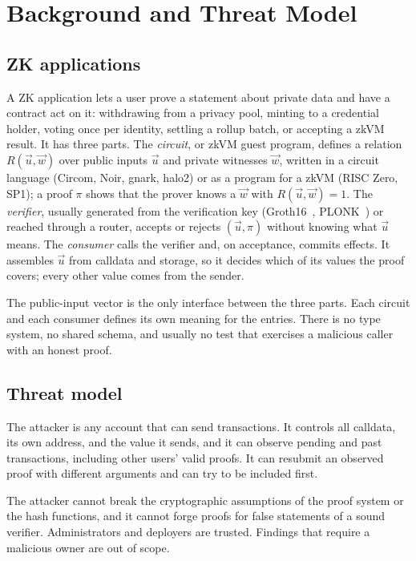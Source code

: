 \section{Background and Threat Model}\label{sec:background}

\subsection{ZK applications}\label{sec:bg-apps}

A ZK application lets a user prove a statement about private data and have a
contract act on it: withdrawing from a privacy pool, minting to a credential
holder, voting once per identity, settling a rollup batch, or accepting a
zkVM result. It has three parts. The \emph{circuit}, or zkVM guest program,
defines a relation $R(\vec{u},\vec{w})$ over public inputs $\vec{u}$ and
private witnesses $\vec{w}$, written in a circuit language (Circom, Noir,
gnark, halo2) or as a program for a zkVM (RISC Zero, SP1); a proof $\pi$
shows that the prover knows a $\vec{w}$ with $R(\vec{u},\vec{w})=1$. The
\emph{verifier}, usually generated from the verification key
(Groth16~\cite{groth16}, PLONK~\cite{plonk}) or reached through a router,
accepts or rejects $(\vec{u},\pi)$ without knowing what $\vec{u}$ means. The
\emph{consumer} calls the verifier and, on acceptance, commits effects. It
assembles $\vec{u}$ from calldata and storage, so it decides which of its
values the proof covers; every other value comes from the sender.

The public-input vector is the only interface between the three parts. Each
circuit and each consumer defines its own meaning for the entries. There is no
type system, no shared schema, and usually no test that exercises a
malicious caller with an honest proof.

\subsection{Threat model}\label{sec:bg-threat}

The attacker is any account that can send transactions. It controls all
calldata, its own address, and the value it sends, and it can observe pending
and past transactions, including other users' valid proofs. It can resubmit an
observed proof with different arguments and can try to be included first.

The attacker cannot break the cryptographic assumptions of the proof system or
the hash functions, and it cannot forge proofs for false statements of a sound
verifier. Administrators and deployers are trusted. Findings that require a
malicious owner are out of scope.

